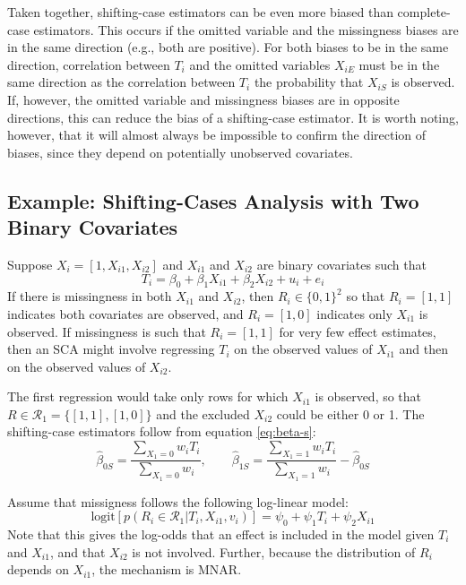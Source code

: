 \documentclass[
]{article}
\begin{document}
Taken together, shifting-case estimators can be even more biased than complete-case estimators.
This occurs if the omitted variable and the missingness biases are in the same direction (e.g., both are positive).
For both biases to be in the same direction, correlation between \(T_i\) and the omitted variables \(X_{iE}\) must be in the same direction as the correlation between \(T_i\) the probability that \(X_{iS}\) is observed.
If, however, the omitted variable and missingness biases are in opposite directions, this can reduce the bias of a shifting-case estimator.
It is worth noting, however, that it will almost always be impossible to confirm the direction of biases, since they depend on potentially unobserved covariates.

\hypertarget{example-shifting-cases-analysis-with-two-binary-covariates}{%
\subsection{Example: Shifting-Cases Analysis with Two Binary Covariates}\label{example-shifting-cases-analysis-with-two-binary-covariates}}

Suppose \(X_i = [1, X_{i1}, X_{i2}]\) and \(X_{i1}\) and \(X_{i2}\) are binary covariates such that
\begin{equation}
T_i = \beta_0 + \beta_1 X_{i1} + \beta_2 X_{i2} + u_i + e_i
\label{eq:sca-ex}
\end{equation}
If there is missingness in both \(X_{i1}\) and \(X_{i2}\), then \(R_i \in \{0, 1\}^2\) so that \(R_i = [1,1]\) indicates both covariates are observed, and \(R_i = [1, 0]\) indicates only \(X_{i1}\) is observed.
If missingness is such that \(R_i = [1, 1]\) for very few effect estimates, then an SCA might involve regressing \(T_i\) on the observed values of \(X_{i1}\) and then on the observed values of \(X_{i2}\).

The first regression would take only rows for which \(X_{i1}\) is observed, so that \(R \in \mathcal{R}_{1} = \{[1,1], [1,0]\}\) and the excluded \(X_{i2}\) could be either 0 or 1.
The shifting-case estimators follow from equation \eqref{eq:beta-s}:
\[
\hat{\beta}_{0S} = \frac{\sum_{X_1 = 0} w_i T_i}{\sum_{X_1 = 0} w_i}, 
\qquad \hat{\beta}_{1S} = \frac{\sum_{X_1 = 1} w_i T_i}{\sum_{X_1 = 1} w_i} - \hat{\beta}_{0S}
\]

Assume that missigness follows the following log-linear model:
\begin{equation}
\text{logit}[p(R_i \in \mathcal{R}_{1} | T_i, X_{i1}, v_i)] = \psi_{0} + \psi_{1} T_i + \psi_{2} X_{i1} 
\label{eq:logit-sca}
\end{equation}
Note that this gives the log-odds that an effect is included in the model given \(T_i\) and \(X_{i1}\), and that \(X_{i2}\) is not involved.
Further, because the distribution of \(R_i\) depends on \(X_{i1}\), the mechanism is MNAR.
\end{document}
